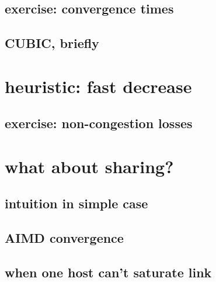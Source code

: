 \subsection{exercise: convergence times}


\subsection{CUBIC, briefly}


\section{heuristic: fast decrease}



\subsection{exercise: non-congestion losses}



\section{what about sharing?}


\subsection{intuition in simple case}


\subsection{AIMD convergence}


\subsection{when one host can't saturate link}


